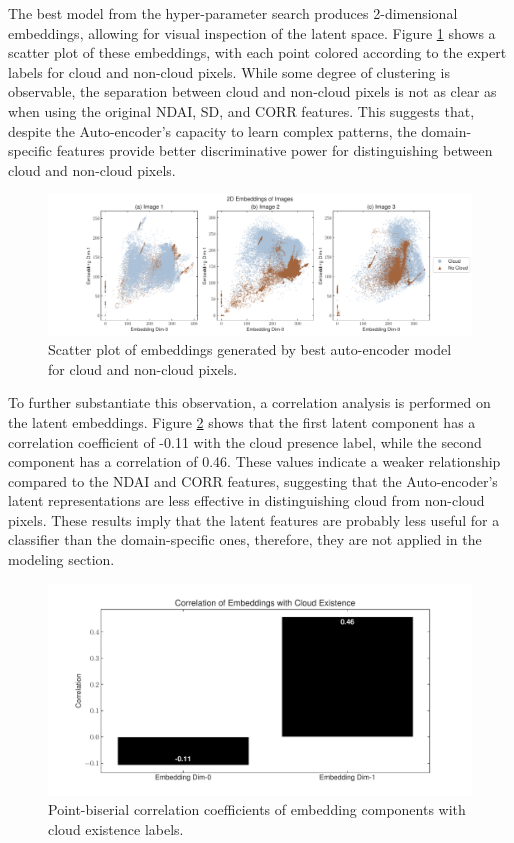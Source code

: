\documentclass[11pt,letterpaper]{article}
\begin{document}
The best model from the hyper-parameter search produces 2-dimensional embeddings, allowing for visual inspection of the latent space. Figure \ref{fig_embeddings} shows a scatter plot of these embeddings, with each point colored according to the expert labels for cloud and non-cloud pixels. While some degree of clustering is observable, the separation between cloud and non-cloud pixels is not as clear as when using the original NDAI, SD, and CORR features. This suggests that, despite the Auto-encoder's capacity to learn complex patterns, the domain-specific features provide better discriminative power for distinguishing between cloud and non-cloud pixels.

\begin{figure}[H]
    \centering
    \includegraphics[width=\linewidth]{figs/embeddings.pdf}
    \caption{Scatter plot of embeddings generated by best auto-encoder model for cloud and non-cloud pixels.}
    \label{fig_embeddings}
\end{figure}

To further substantiate this observation, a correlation analysis is performed on the latent embeddings. Figure \ref{fig_emb_correlations} shows that the first latent component has a correlation coefficient of -0.11 with the cloud presence label, while the second component has a correlation of 0.46. These values indicate a weaker relationship compared to the NDAI and CORR features, suggesting that the Auto-encoder's latent representations are less effective in distinguishing cloud from non-cloud pixels. These results imply that the latent features are probably less useful for a classifier than the domain-specific ones, therefore, they are not applied in the modeling section.

\begin{figure}[H]
    \centering
    \includegraphics[width=\linewidth]{figs/correlation_embeddings.pdf}
    \caption{Point-biserial correlation coefficients of embedding components with cloud existence labels.}
    \label{fig_emb_correlations}
\end{figure}
\end{document}
